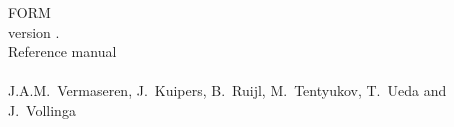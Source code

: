 \documentclass{report}
\begin{document}
\begin{center}
{\Huge FORM \\ \Large version \formmajorversion.\formminorversion
  \\ \huge Reference manual} \\

{\formdate} \\

{J.A.M.~Vermaseren, J.~Kuipers, B.~Ruijl, M.~Tentyukov, T.~Ueda and J.~Vollinga}
\end{center}

\tableofcontents






















\printindex
\end{document}
